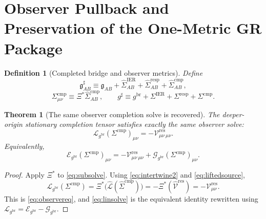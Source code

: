 \documentclass[11pt]{article}
\newcommand{\ObserverMap}{\Xi}
\newcommand{\BridgeMetric}{\mathfrak g}
\newcommand{\ObserverMetric}{g^{\mathrm{br}}}
\newcommand{\CompletedMetric}{g^{\sharp}}
\newcommand{\BaseShift}{\Sigma^{\mathrm{IER}}}
\newcommand{\ResponseShift}{\Sigma^{\mathrm{resp}}}
\newcommand{\CompShift}{\Sigma^{\mathrm{cmp}}}
\newcommand{\BaseLift}{\widehat\Sigma^{\mathrm{IER}}}
\newcommand{\ResponseLift}{\widehat\Sigma^{\mathrm{resp}}}
\newcommand{\CompLift}{\widehat\Sigma^{\mathrm{cmp}}}
\newcommand{\ResidualCore}{\mathcal V_{\mu\nu}^{\mathrm{res}}}
\newcommand{\ResidualLift}{\widehat{\mathcal V}^{\mathrm{res}}}
\newcommand{\SubReducedEin}{\widehat{\mathcal L}}
\newcommand{\ReducedEin}{\mathcal L_{\ObserverMetric}}
\newcommand{\GaugeBook}{\mathcal G_{\ObserverMetric}}
\newcommand{\EinLin}{\mathcal E_{\ObserverMetric}}
\newtheorem{definition}{Definition}
\newtheorem{theorem}{Theorem}
\begin{document}
\section{Observer Pullback and Preservation of the One-Metric GR Package}

\begin{definition}[Completed bridge and observer metrics]
\label{def:completed}
Define
\begin{equation}
\BridgeMetric_{AB}^{\sharp}
\equiv
\BridgeMetric_{AB}
+\BaseLift_{AB}
+\ResponseLift_{AB}
+\CompLift_{AB},
\label{eq:bridgecompleted}
\end{equation}
\begin{equation}
\CompShift_{\mu\nu}
\equiv
\ObserverMap^*\CompLift_{AB},
\qquad
\CompletedMetric
\equiv
\ObserverMetric+\BaseShift+\ResponseShift+\CompShift.
\label{eq:defsigma}
\end{equation}
\end{definition}

\begin{theorem}[The same observer completion solve is recovered]
\label{thm:observer}
The deeper-origin stationary completion tensor satisfies exactly the same observer solve:
\begin{equation}
\ReducedEin(\CompShift)_{\mu\nu}
=
-\ResidualCore{}_{\mu\nu}.
\label{eq:observereq}
\end{equation}
Equivalently,
\begin{equation}
\EinLin(\CompShift)_{\mu\nu}
=
-\ResidualCore{}_{\mu\nu}
+\GaugeBook(\CompShift)_{\mu\nu}.
\label{eq:linsolve}
\end{equation}
\end{theorem}

\begin{proof}
Apply \(\ObserverMap^*\) to \eqref{eq:subsolve}. Using \eqref{eq:intertwine2} and \eqref{eq:liftedsource},
\[
\ReducedEin(\CompShift)
=
\ObserverMap^*\bigl(\SubReducedEin(\CompLift)\bigr)
=
-\ObserverMap^*(\ResidualLift)
=
-\ResidualCore.
\]
This is \eqref{eq:observereq}, and \eqref{eq:linsolve} is the equivalent identity rewritten using \(\ReducedEin=\EinLin-\GaugeBook\).
\end{proof}
\end{document}
